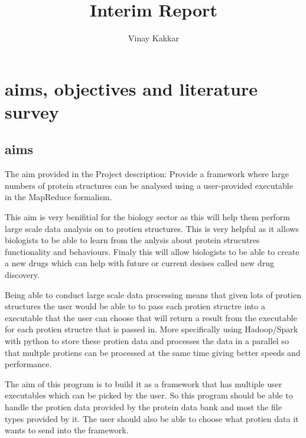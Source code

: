 \documentclass{report}
\title{Interim Report}
\author{Vinay Kakkar}
\begin{document}
\maketitle

\tableofcontents

\begin{abstract}


\end{abstract}

\renewcommand\thesection{\arabic{section}}

\section{aims, objectives and literature survey}

\subsection{aims}

The aim provided in the Project description: Provide a framework where large numbers of protein structures can be analysed using a user-provided executable in the MapReduce formalism.

This aim is very benifitial for the biology sector as this will help them perform large scale data analysis on to protien structures. This is very helpful as it allows biologists to be able to learn from the anlysis about protein strucutres functionality and behaviours. Finaly this will allow biologists to be able to create a new drugs which can help with future or current desises called new drug discovery. 

Being able to conduct large scale data processing means that given lots of protien structures the user would be able to to pass each protien structre into a executable that the user can choose that will return a result from the executable for each protien structre that is passed in. More specifically using Hadoop/Spark with python to store these protien data and processes the data in a parallel so that multple protiens can be processed at the same time giving better speeds and performance.

The aim of this program is to build it as a framework that has multiple user executables which can be picked by the user. So this program should be able to handle the protien data provided by the protein data bank and most the file types provided by it. The user should also be able to choose what protien data it wants to send into the framework.
\end{document}
